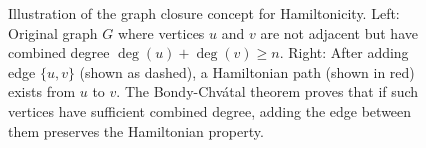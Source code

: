 \documentclass{article}
\theoremstyle{definition}
\begin{document}
\begin{figure}[h!]
\caption{Illustration of the graph closure concept for Hamiltonicity. Left: Original graph $G$ where vertices $u$ and $v$ are not adjacent but have combined degree $\deg(u) + \deg(v) \geq n$. Right: After adding edge $\{u,v\}$ (shown as dashed), a Hamiltonian path (shown in red) exists from $u$ to $v$. The Bondy-Chvátal theorem proves that if such vertices have sufficient combined degree, adding the edge between them preserves the Hamiltonian property.}
\label{fig:closure}
\end{figure}
\end{document}
